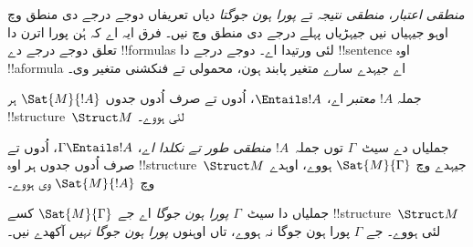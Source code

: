 \documentclass[../../../include/open-logic-section]{subfiles}
\begin{document}

\begin{explain}
\emph{منطقی اعتبار}، \emph{منطقی نتیجہ} تے
\emph{پورا ہون جوگتا} دیاں تعریفاں دوجے درجے دی منطق وچ
اوہو جیہیاں نیں جیہڑیاں پہلے درجے دی منطق وچ نیں۔ فرق ایہ
اے کہ ہُن پورا اترن دا تعلق دوجے درجے دے !!{formula}s لئی
ورتیدا اے۔ دوجے درجے دا
!!{sentence} اوہ !!a{formula} اے جیہدے سارے
متغیر پابند ہون، محمولی تے فنکشنی متغیر وی۔
\end{explain}

\begin{defn}
جملہ $!A$ \emph{معتبر} اے، $\Entails !A$،
اُدوں تے صرف اُدوں جدوں $\Sat{M}{!A}$ ہر
!!{structure}~$\Struct M$ لئی ہووے۔
\end{defn}

\begin{defn}
جملیاں دے سیٹ~$\Gamma$ توں جملہ~$!A$
\emph{منطقی طور تے نکلدا اے}، $\Gamma
\Entails !A$، اُدوں تے صرف اُدوں جدوں ہر اوہ !!{structure}~$\Struct M$ جیہدے وچ
$\Sat{M}{\Gamma}$ ہووے، اوہدے وچ $\Sat{M}{!A}$ وی ہووے۔
\end{defn}

\begin{defn}
جملیاں دا سیٹ~$\Gamma$ \emph{پورا ہون جوگا} اے
جے $\Sat{M}{\Gamma}$ کسے
!!{structure}~$\Struct M$ لئی ہووے۔ جے
$\Gamma$ پورا ہون جوگا نہ ہووے، تاں اوہنوں
\emph{پورا ہون جوگا نہیں} آکھدے نیں۔
\end{defn}
\end{document}
